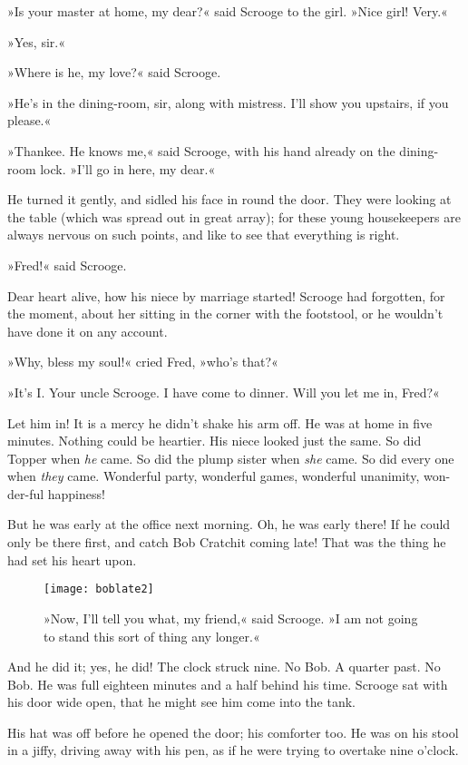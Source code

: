 »Is your master at home, my dear?« said Scrooge to the girl. »Nice girl! Very.«

»Yes, sir.«

»Where is he, my love?« said Scrooge.

»He's in the dining-room, sir, along with mistress. I'll show you upstairs, if you please.«

»Thankee. He knows me,« said Scrooge, with his hand already on the dining-room lock. »I'll go in here, my dear.«

He turned it gently, and sidled his face in round the door. They were looking at the table (which was spread out in great array); for these young housekeepers are always nervous on such points, and like to see that everything is right.

»Fred!« said Scrooge.

Dear heart alive, how his niece by marriage started! Scrooge had forgotten, for the moment, about her sitting in the corner with the footstool, or he wouldn't have done it on any account.

»Why, bless my soul!« cried Fred, »who's that?«

»It's I. Your uncle Scrooge. I have come to dinner. Will you let me in, Fred?«

Let him in! It is a mercy he didn't shake his arm off. He was at home in five minutes. Nothing could be heartier. His niece looked just the same. So did Topper when \textit{he} came. So did the plump sister when \textit{she} came. So did every one when \textit{they} came. Wonderful party, wonderful games, wonderful unanimity, won-der-ful happiness!

But he was early at the office next morning. Oh, he was early there! If he could only be there first, and catch Bob Cratchit coming late! That was the thing he had set his heart upon.

\begin{figure}[p]
\centering
\texttt{[image: boblate2]}
\caption[\textbf{»I am not going to stand this any longer.«}]{»Now, I'll tell you what, my friend,« said Scrooge. »I am not going to stand this sort of thing any longer.«}
\end{figure}

And he did it; yes, he did! The clock struck nine. No Bob. A quarter past. No Bob. He was full eighteen minutes and a half behind his time. Scrooge sat with his door wide open, that he might see him come into the tank.

His hat was off before he opened the door; his comforter too. He was on his stool in a jiffy, driving away with his pen, as if he were trying to overtake nine o'clock.

